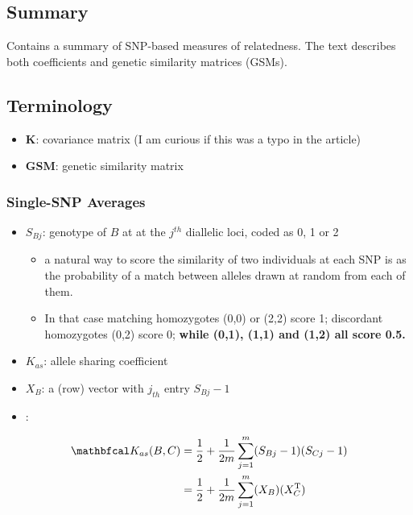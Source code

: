 \documentclass[document.tex]{subfiles}
\begin{document}

\subsection{Summary}
Contains a summary of SNP-based measures of relatedness. 
The text describes both coefficients and genetic similarity matrices (GSMs).

\subsection{Terminology}
\begin{itemize}
    \item \textbf{K}: covariance matrix (I am curious if this was a typo in the article)
    \item \textbf{GSM}: genetic similarity matrix
\end{itemize}

\subsubsection{Single-SNP Averages}
\begin{itemize}
    \item \textbf{$S_{Bj}$}: genotype of $B$ at at the $j^{th}$ diallelic loci, \alert{coded as 0, 1 or 2}
    \begin{itemize}
        \item a natural way to score the similarity of two individuals at each SNP is as the probability of a match between alleles drawn at random from each of them.
        \item In that case matching homozygotes (0,0) or (2,2) score 1; discordant homozygotes (0,2) score 0; \textbf{while (0,1), (1,1) and (1,2) all score 0.5.}
    \end{itemize}
    \item \textbf{$K_{as}$}: allele sharing coefficient
    \item \textbf{$X_B$}: a (row) vector with $j_{th}$ entry $S_{Bj}-1$
    \item \textbf{}:
\end{itemize}
\begin{equation}
    \begin{split}
        \mat{K}_{as}(B,C) & = \frac{1}{2} + \frac{1}{2m} \sum\limits_{j=1}^m (S_{Bj}-1)(S_{Cj}-1) \\
                    & = \frac{1}{2} + \frac{1}{2m} \sum\limits_{j=1}^m (X_B)(X_C^\text{T})
    \end{split}
\end{equation}
\end{document}
